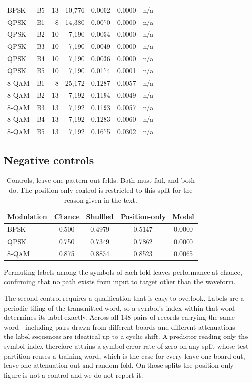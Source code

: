 \documentclass[journal]{IEEEtran}   %
\begin{document}
\begin{table}[!t]
\begin{tabular}{llrrrrr}
BPSK & B5 & 13 & 10{,}776 & 0.0002 & 0.0000 & n/a \\
QPSK & B1 & 8 & 14{,}380 & 0.0070 & 0.0000 & n/a \\
QPSK & B2 & 10 & 7{,}190 & 0.0054 & 0.0000 & n/a \\
QPSK & B3 & 10 & 7{,}190 & 0.0049 & 0.0000 & n/a \\
QPSK & B4 & 10 & 7{,}190 & 0.0036 & 0.0000 & n/a \\
QPSK & B5 & 10 & 7{,}190 & 0.0174 & 0.0001 & n/a \\
8-QAM & B1 & 8 & 25{,}172 & 0.1287 & 0.0057 & n/a \\
8-QAM & B2 & 13 & 7{,}192 & 0.1194 & 0.0049 & n/a \\
8-QAM & B3 & 13 & 7{,}192 & 0.1193 & 0.0057 & n/a \\
8-QAM & B4 & 13 & 7{,}192 & 0.1283 & 0.0060 & n/a \\
8-QAM & B5 & 13 & 7{,}192 & 0.1675 & 0.0302 & n/a \\
\bottomrule
\end{tabular}
\end{table}

\subsection{Negative controls}
\label{sec:controls}
\begin{table}[!t]
\caption{Controls, leave-one-pattern-out folds. Both must fail, and both do.
The position-only control is restricted to this split for the reason given in
the text.}
\label{tab:controls}
\centering
\begin{tabular}{lcccc}
\toprule
Modulation & Chance & Shuffled & Position-only & Model \\
\midrule
BPSK  & 0.500 & 0.4979 & 0.5147 & 0.0000 \\
QPSK  & 0.750 & 0.7349 & 0.7862 & 0.0000 \\
8-QAM & 0.875 & 0.8834 & 0.8523 & 0.0065 \\
\bottomrule
\end{tabular}
\end{table}

Permuting labels among the symbols of each fold leaves performance at chance,
confirming that no path exists from input to target other than the waveform.

The second control requires a qualification that is easy to overlook. Labels are
a periodic tiling of the transmitted word, so a symbol's index within that word
determines its label exactly. Across all $148$ pairs of records carrying the same
word---including pairs drawn from different boards and different
attenuations---the label sequences are identical up to a cyclic shift. A
predictor reading only the symbol index therefore attains a symbol error rate of
zero on any split whose test partition reuses a training word, which is the case
for every leave-one-board-out, leave-one-attenuation-out and random fold. On
those splits the position-only figure is not a control and we do not report it.
\end{document}
